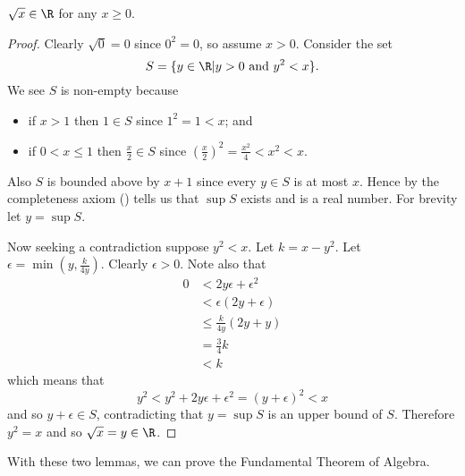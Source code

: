 \begin{lemma}\label{lemma-non-negative-real-number-has-square-root}
    $\sqrt x \in \R$ for any $x \geq 0$.
\end{lemma}
\begin{proof}
    Clearly $\sqrt0=0$ since $0^2=0$, so assume $x > 0$. Consider the set
    \[
        S = \{y \in \R \vert y > 0 \text{ and } y^2 < x\}.
    \]
    We see $S$ is non-empty because
    \begin{itemize}
        \item if $x > 1$ then $1 \in S$ since $1^2 = 1 < x$; and
        \item if $0 < x \leq 1$ then $\frac x2 \in S$ since $\left(\frac x2\right)^2 = \frac{x^2}4 < x^2 < x$.
    \end{itemize}
    Also $S$ is bounded above by $x + 1$ since every $y \in S$ is at most $x$. Hence by the completeness axiom () tells us that $\sup S$ exists and is a real number. For brevity let $y = \sup S$.

    Now seeking a contradiction suppose $y^2 < x$. Let $k = x - y^2$. Let $\epsilon = \min(y, \frac{k}{4y})$. Clearly $\epsilon > 0$. Note also that
    \begin{align*}
        0 &< 2y\epsilon + \epsilon^2\\
        &<\epsilon(2y + \epsilon)\\
        &\leq \frac{k}{4y}(2y + y)\\
        &= \frac 34 k\\
        &< k
    \end{align*}
    which means that
    \[
        y^2 < y^2 + 2y\epsilon + \epsilon^2 = (y+\epsilon)^2 < x
    \]
    and so $y + \epsilon \in S$, contradicting that $y = \sup S$ is an upper bound of $S$. Therefore $y^2 = x$ and so $\sqrt x = y \in \R$.
\end{proof}

With these two lemmas, we can prove the Fundamental Theorem of Algebra.

